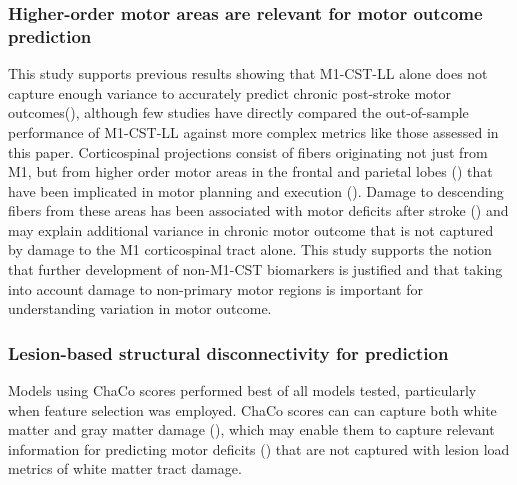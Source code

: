 \documentclass[10pt]{article}
\begin{document}
\subsubsection*{Higher-order motor areas are relevant for motor outcome prediction}
This study supports previous results showing that M1-CST-LL alone does not capture enough variance to accurately predict chronic post-stroke motor outcomes(\cite{Rondina2017-ij, Park2016-te, Ito2022-em}), although few studies have directly compared the out-of-sample performance of M1-CST-LL against more complex metrics like those assessed in this paper. Corticospinal projections consist of fibers originating not just from M1, but from higher order motor areas in the frontal and parietal lobes (\cite{Galea1994-yi}) that have been implicated in motor planning and execution (\cite{Ball1999-yo}). Damage to descending fibers from these areas has been associated with motor deficits after stroke (\cite{Ito2022-em, Riley2011-xo}) and may explain additional variance in chronic motor outcome that is not captured by damage to the M1 corticospinal tract alone. This study supports the notion that further development of non-M1-CST biomarkers is justified and that taking into account damage to non-primary motor regions is important for understanding variation in motor outcome.

\subsubsection*{Lesion-based structural disconnectivity for prediction}

Models using ChaCo scores performed best of all models tested, particularly when feature selection was employed. ChaCo scores can can capture both white matter and gray matter damage (\cite{Kuceyeski2013-nk}), which may enable them to capture relevant information for predicting motor deficits (\cite{Park2016-te,Rondina2016-ds}) that are not captured with lesion load metrics of white matter tract damage. 
\end{document}
